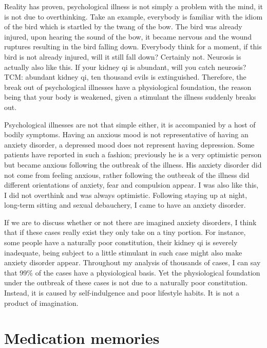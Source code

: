 \documentclass[
]{book}
\begin{document}
Reality has proven, psychological illness is not simply a problem with the mind, it is not due to overthinking. Take an example, everybody is familiar with the idiom of the bird which is startled by the twang of the bow. The bird was already injured, upon hearing the sound of the bow, it became nervous and the wound ruptures resulting in the bird falling down. Everybody think for a moment, if this bird is not already injured, will it still fall down? Certainly not. Neurosis is actually also like this. If your kidney qi is abundant, will you catch neurosis? TCM: abundant kidney qi, ten thousand evils is extinguished. Therefore, the break out of psychological illnesses have a physiological foundation, the reason being that your body is weakened, given a stimulant the illness suddenly breaks out.

Psychological illnesses are not that simple either, it is accompanied by a host of bodily symptoms. Having an anxious mood is not representative of having an anxiety disorder, a depressed mood does not represent having depression. Some patients have reported in such a fashion; previously he is a very optimistic person but became anxious following the outbreak of the illness. His anxiety disorder did not come from feeling anxious, rather following the outbreak of the illness did different orientations of anxiety, fear and compulsion appear. I was also like this, I did not overthink and was always optimistic. Following staying up at night, long-term sitting and sexual debauchery, I came to have an anxiety disorder.

If we are to discuss whether or not there are imagined anxiety disorders, I think that if these cases really exist they only take on a tiny portion. For instance, some people have a naturally poor constitution, their kidney qi is severely inadequate, being subject to a little stimulant in such case might also make anxiety disorder appear. Throughout my analysis of thousands of cases, I can say that 99\% of the cases have a physiological basis. Yet the physiological foundation under the outbreak of these cases is not due to a naturally poor constitution. Instead, it is caused by self-indulgence and poor lifestyle habits. It is not a product of imagination.

\hypertarget{medication-memories}{%
\section{Medication memories}\label{medication-memories}}
\end{document}

